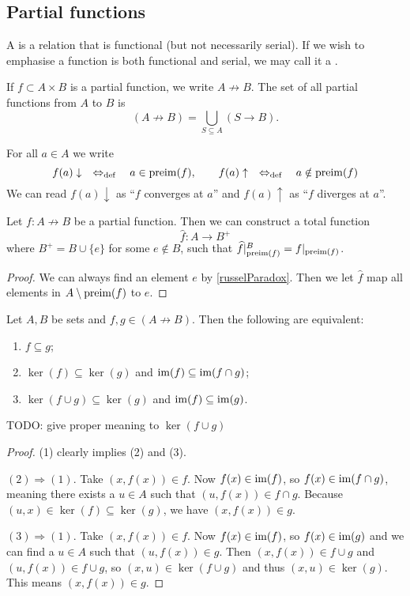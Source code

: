 \subsection{Partial functions}
\begin{definition}
A  is a relation that is functional (but not necessarily serial). If we wish to emphasise a function is both functional and serial, we may call it a .
\end{definition}
If $f\subset A\times B$ is a partial function, we write $A\not \to B$. The set of all partial functions from $A$ to $B$ is
\[ (A\not \to B) = \bigcup _{S\subseteq A}(S\to B). \]

For all $a\in A$ we write
\[ f(a)\downarrow \quad\Leftrightarrow_{\text{def}}\quad a\in\operatorname{preim}(f),\qquad f(a)\uparrow \quad\Leftrightarrow_{\text{def}}\quad a\notin\operatorname{preim}(f) \]
We can read $f(a)\downarrow$ as ``$f$ converges at $a$'' and $f(a)\uparrow$ as ``$f$ diverges at $a$''.

\begin{lemma} \label{partialFunctionExtension}
Let $f: A \not\to B$ be a partial function. Then we can construct a total function
\[ \widehat{f}: A \to B^+ \]
where $B^+ = B\cup \{e\}$ for some $e\notin B$, such that $\widehat{f}|_{\operatorname{preim}(f)}^B = f|_{\operatorname{preim}(f)}$.
\end{lemma}
\begin{proof}
We can always find an element $e$ by \ref{russelParadox}. Then we let $\widehat{f}$ map all elements in $A\setminus\operatorname{preim}(f)$ to $e$.
\end{proof}

\begin{proposition} \label{partialFunctionSubset}
Let $A,B$ be sets and $f,g\in(A\not\to B)$. Then the following are equivalent:
\begin{enumerate}
\item $f\subseteq g$;
\item $\ker(f) \subseteq \ker(g)$ and $\operatorname{im}(f)\subseteq \operatorname{im}(f\cap g)$;
\item $\ker(f\cup g) \subseteq \ker(g)$ and $\operatorname{im}(f)\subseteq \operatorname{im}(g)$.
\end{enumerate}
TODO: give proper meaning to $\ker(f\cup g)$
\end{proposition}
\begin{proof}
(1) clearly implies (2) and (3).

$(2) \Rightarrow (1)$. Take $(x,f(x)) \in f$. Now $f(x)\in \operatorname{im}(f)$, so $f(x)\in\operatorname{im}(f\cap g)$, meaning there exists a $u\in A$ such that $(u,f(x))\in f\cap g$. Because $(u,x)\in \ker(f)\subseteq \ker(g)$, we have $(x,f(x))\in g$.

$(3) \Rightarrow (1)$. Take $(x,f(x)) \in f$. Now $f(x)\in \operatorname{im}(f)$, so $f(x)\in\operatorname{im}(g)$ and we can find a $u\in A$ such that $(u,f(x))\in g$. Then $(x,f(x)) \in f\cup g$ and $(u,f(x))\in f\cup g$, so $(x,u)\in \ker(f\cup g)$ and thus $(x,u)\in\ker(g)$. This means $(x,f(x))\in g$.
\end{proof}

